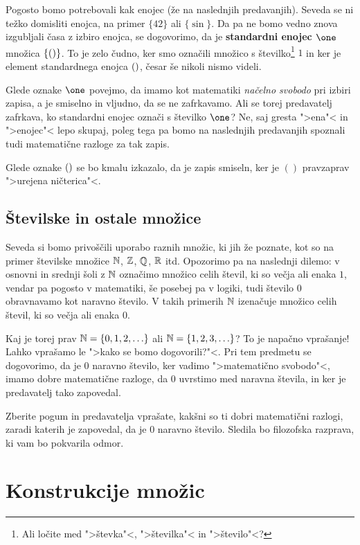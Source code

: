 Pogosto bomo potrebovali kak enojec (že na naslednjih predavanjih). Seveda se ni težko domisliti enojca, na primer $\{42\}$ ali $\{\sin\}$. Da pa ne bomo vedno znova izgubljali časa z izbiro enojca, se dogovorimo, da je \textbf{standardni enojec $\one$} množica $\{()\}$. To je zelo čudno, ker smo označili množico s številko\footnote{Ali ločite med ">števka"<, ">številka"< in ">število"<?} $1$ in ker je element standardnega enojca $()$, česar še nikoli nismo videli.

Glede oznake $\one$ povejmo, da imamo kot matematiki \emph{načelno svobodo} pri izbiri zapisa, a je smiselno in vljudno, da se ne zafrkavamo. Ali se torej predavatelj zafrkava, ko standardni enojec označi s številko $\one$? Ne, saj gresta ">ena"< in ">enojec"< lepo skupaj, poleg tega pa bomo na naslednjih predavanjih spoznali tudi matematične razloge za tak zapis.

Glede oznake $()$ se bo kmalu izkazalo, da je zapis smiseln, ker je $()$ pravzaprav ">urejena ničterica"<.

\subsection{Številske in ostale množice}

Seveda si bomo privoščili uporabo raznih množic, ki jih že poznate, kot so na primer številske množice $\mathbb{N}$, $\mathbb{Z}$, $\mathbb{Q}$, $\mathbb{R}$ itd. Opozorimo pa na naslednji dilemo:
v osnovni in srednji šoli z $\mathbb{N}$ označimo množico celih števil, ki so večja ali enaka $1$, vendar pa pogosto v matematiki, še posebej pa v logiki, tudi število $0$ obravnavamo kot naravno število. V takih primerih $\mathbb{N}$ izenačuje množico celih števil, ki so večja ali enaka $0$.

Kaj je torej prav $\mathbb{N} = \{0, 1, 2, \ldots\}$ ali $\mathbb{N} = \{1, 2, 3, \ldots\}$? To je napačno vprašanje! Lahko vprašamo le ">kako se bomo dogovorili?"<. Pri tem predmetu se
dogovorimo, da je $0$ naravno število, ker vadimo ">matematično svobodo"<, imamo dobre matematične razloge, da $0$ uvrstimo med naravna števila, in ker je predavatelj tako zapovedal.

\begin{naloga}
  Zberite pogum in predavatelja vprašate, kakšni so ti dobri matematični razlogi, zaradi katerih je zapovedal, da je $0$ naravno število. Sledila bo filozofska razprava, ki vam bo pokvarila odmor.
\end{naloga}

\section{Konstrukcije množic}

